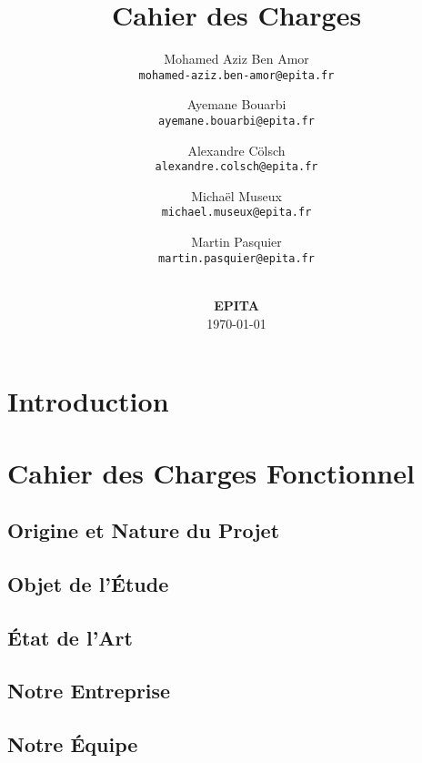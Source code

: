 \documentclass[11pt]{article}
\title{
    Cahier des Charges \\
    \textbf{\gameName}
    \vspace{6cm}
}
\author{
    Mohamed Aziz Ben Amor \\
    \texttt{mohamed-aziz.ben-amor@epita.fr}
    \vspace{0.5cm}\and
    Ayemane Bouarbi \\
    \texttt{ayemane.bouarbi@epita.fr}
    \vspace{0.5cm}\and
    Alexandre Cölsch \\
    \texttt{alexandre.colsch@epita.fr}
    \vspace{0.5cm}\and
    Michaël Museux \\
    \texttt{michael.museux@epita.fr}
    \vspace{0.5cm}\and
    Martin Pasquier \\
    \texttt{martin.pasquier@epita.fr}
}
\date{
    \vspace{1.5cm}
    \textbf{\companyName} \\
    \vspace{0.3cm}
    \textbf{EPITA} \\
    \vspace{1.5cm}
    \today
}
\begin{document}
\begin{titlepage}
    \maketitle
    \thispagestyle{empty} %
\end{titlepage}

\newpage
\thispagestyle{empty}
\mbox{}

\newpage
\tableofcontents

\newpage
\section{Introduction}





\newpage
\section{Cahier des Charges Fonctionnel}

\subsection{Origine et Nature du Projet}



\subsection{Objet de l'\'Etude}



\subsection{\'Etat de l'Art}



\subsection{Notre Entreprise}



\subsection{Notre \'Equipe}


\end{document}
